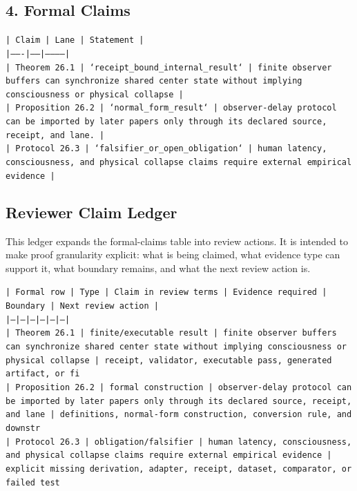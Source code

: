 \documentclass[11pt]{article}
\begin{document}
\subsection*{4. Formal Claims}

\noindent\texttt{| Claim | Lane | Statement |}\\
\noindent\texttt{|-------|------|-----------|}\\
\noindent\texttt{| Theorem 26.1 | `receipt\_bound\_internal\_result` | finite observer buffers can synchronize shared center state without implying consciousness or physical collapse |}\\
\noindent\texttt{| Proposition 26.2 | `normal\_form\_result` | observer-delay protocol can be imported by later papers only through its declared source, receipt, and lane. |}\\
\noindent\texttt{| Protocol 26.3 | `falsifier\_or\_open\_obligation` | human latency, consciousness, and physical collapse claims require external empirical evidence |}\\

\subsection*{Reviewer Claim Ledger}

This ledger expands the formal-claims table into review actions. It is intended to make proof granularity explicit: what is being claimed, what evidence type can support it, what boundary remains, and what the next review action is.

\noindent\texttt{| Formal row | Type | Claim in review terms | Evidence required | Boundary | Next review action |}\\
\noindent\texttt{|---|---|---|---|---|---|}\\
\noindent\texttt{| Theorem 26.1 | finite/executable result | finite observer buffers can synchronize shared center state without implying consciousness or physical collapse | receipt, validator, executable pass, generated artifact, or fi}\\
\noindent\texttt{| Proposition 26.2 | formal construction | observer-delay protocol can be imported by later papers only through its declared source, receipt, and lane | definitions, normal-form construction, conversion rule, and downstr}\\
\noindent\texttt{| Protocol 26.3 | obligation/falsifier | human latency, consciousness, and physical collapse claims require external empirical evidence | explicit missing derivation, adapter, receipt, dataset, comparator, or failed test}\\
\end{document}
